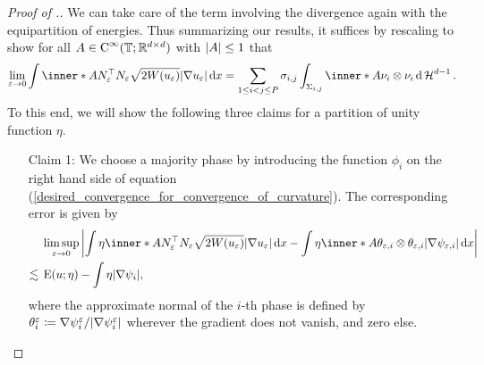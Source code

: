 \begin{proof}[Proof of .]
	We can take care of the term involving the divergence again with the 
	equipartition of energies. 
	Thus summarizing our results, it suffices by rescaling to show for all $ 
	A \in \operatorname{C}^{ \infty } ( \operatorname{\mathbb{T}} ; \mathbb{ R }^{ d \times d } ) $ with 
	$ \abs{ A } \leq 1 $ that
	\begin{equation}
		\label{desired_convergence_for_convergence_of_curvature}
		\lim_{ \varepsilon \to 0 }
		\int
		\inner*{ A }{ N_{ \varepsilon }^{ \top } N_{ \varepsilon } }
		\sqrt{ 2 W ( u_{ \varepsilon } ) }
		\abs{ \nabla u_{ \varepsilon } }
		\dd{ x }
		=
		\sum_{ 1 \leq i < j \leq P }
		\sigma_{ i , j }
		\int_{ \Sigma_{ i , j } }
		\inner*{ A }{ \nu_{ i } \otimes \nu_{ i } }
		\dd{ \hm^{ d - 1 } }.
	\end{equation}
	To this end, we will show the following three claims for a partition of 
	unity function $ \eta $.
	\begin{itemize}[wide=0pt]
		\item[Claim 1:]
		We choose a majority phase by introducing the function $ \phi_{ i } $ 
		on the right hand side of equation 
		(\ref{desired_convergence_for_convergence_of_curvature}). The 
		corresponding error is given by
		\begin{align*}
			& \limsup_{ \varepsilon \to 0 }
			\abs{ 
				\int
				\eta 
				\inner*{ A }{ N_{ \varepsilon }^{ \top } N_{ \varepsilon } }
				\sqrt{ 2 W ( u_{ \varepsilon } ) } \abs{ \nabla u_{ \varepsilon 
				} } 
				\dd{ x }
				-
				\int
				\eta
				\inner*{ A }{ \theta_{ \varepsilon, i } \otimes \theta_{ 
						\varepsilon , i } }
				\abs{ \nabla \psi_{ \varepsilon , i } }
				\dd{ x }
			}
			\\
			\lesssim{} &
			\energy ( u ; \eta ) 
			-
			\int
			\eta
			\abs{ \nabla \psi_{ i } },
		\end{align*}
		where the approximate normal of the $ i$-th phase is defined by $ 
		\theta_{ 
		i }^{ \varepsilon } \coloneqq \nabla \psi_{ i }^{ \varepsilon } / \abs{ 
		\nabla \psi_{ i }^{ \varepsilon } } $ wherever the gradient does not 
		vanish, and zero else.
		

\end{itemize}
\end{proof}
